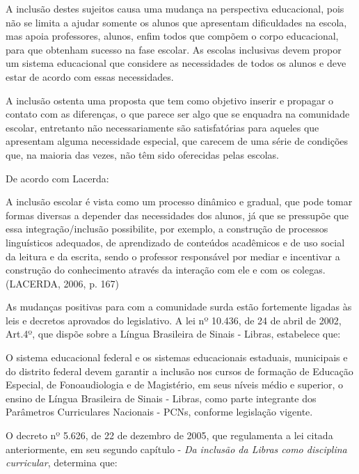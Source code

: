 \documentclass[brasil]{abnt}
\begin{document}
	A inclusão destes sujeitos causa uma mudança na perspectiva educacional, pois não se limita a ajudar somente os alunos que apresentam dificuldades na escola, mas apoia professores, alunos,
	enfim todos que compõem o corpo educacional, para que obtenham sucesso na fase escolar. As escolas inclusivas devem propor um sistema educacional que considere as necessidades de todos os alunos e 
	deve estar de acordo com essas necessidades. 
		
		A inclusão ostenta uma proposta que tem como objetivo inserir e propagar o contato com as diferenças, o que parece ser algo que se enquadra na comunidade escolar, entretanto não necessariamente 
		são satisfatórias para aqueles que apresentam alguma necessidade especial, que carecem de uma série de condições que, na maioria das vezes, não têm sido oferecidas pelas escolas.
		
		De acordo com Lacerda:
		
			\begin{citacao}A inclusão escolar é vista como um processo dinâmico e gradual, que pode tomar formas diversas a depender das necessidades dos alunos, já que se pressupõe que essa integração/inclusão 
							possibilite, por exemplo, a construção de processos linguísticos adequados, de aprendizado de conteúdos acadêmicos e de uso social da leitura e da escrita, sendo o professor 
							responsável por mediar e incentivar a construção do conhecimento através da interação com ele e com os colegas. (LACERDA, 2006, p. 167)
			\end{citacao}
			
		As mudanças positivas para com a comunidade surda estão fortemente ligadas às leis e decretos aprovados do legislativo. A lei nº 10.436, de 24 de abril de 2002, Art.4º, que dispõe sobre a 
		Língua Brasileira de Sinais - Libras, estabelece que:
		
			\begin{citacao} O sistema educacional federal e os sistemas educacionais estaduais, municipais e do distrito federal devem garantir a inclusão nos cursos de formação de Educação Especial, de 
							Fonoaudiologia e de Magistério, em seus níveis médio e superior, o ensino de Língua Brasileira de Sinais - Libras, como parte integrante dos Parâmetros Curriculares Nacionais - 
							PCNs, conforme legislação vigente.
			\end{citacao}
		
		O decreto nº 5.626, de 22 de dezembro de 2005, que regulamenta a lei citada anteriormente, em seu segundo capítulo - \textit{Da inclusão da Libras como disciplina curricular}, determina que:
		
\end{document}
